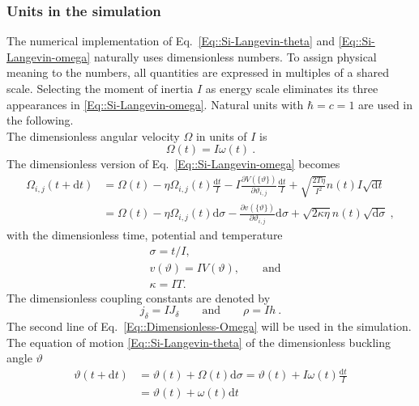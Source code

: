 	\subsubsection{Units in the simulation}
	The numerical implementation of Eq.~\eqref{Eq::Si-Langevin-theta} and \eqref{Eq::Si-Langevin-omega} naturally uses dimensionless numbers. To assign physical meaning to the numbers, all quantities are expressed in multiples of a shared scale. Selecting the moment of inertia $I$ as energy scale eliminates its three appearances in \eqref{Eq::Si-Langevin-omega}. Natural units with $\hbar =	c =	1$ are used in the following. \\
	
	The dimensionless angular velocity $\Omega$ in units of $I$ is
	\begin{equation}
		\Omega(t) =	I\omega(t)~.
	\end{equation}
	The dimensionless version of Eq.~\eqref{Eq::Si-Langevin-omega} becomes
	\begin{equation} \label{Eq::Dimensionless-Omega}
		\begin{split}
			\Omega_{i,j}(t + \text{d}t) &=	\Omega(t) - \eta \Omega_{i,j}(t) \frac{\text{d}t}{I} - {I}\frac{\partial V(\{\vartheta\})}{\partial \vartheta_{i,j}} \frac{\text{d}t}{I} + \sqrt{\frac{2 T \eta}{I^2}} n(t) I \sqrt{\text{d}t} \\
			&=	\Omega(t) - \eta \Omega_{i,j}(t) \text{d}\sigma - \frac{\partial v(\{\vartheta\})}{\partial \vartheta_{i,j}} \text{d}\sigma + \sqrt{{2 \kappa \eta}} n(t) \sqrt{\text{d}\sigma}~,
		\end{split}
	\end{equation}
	with the dimensionless time, potential and temperature
	\begin{align}
		&\sigma =	t /	I, \\
		&v(\vartheta) =	I V(\vartheta), \qquad \text{and} \\
		&\kappa =	IT.
	\end{align}
	The dimensionless coupling constants are denoted by
	\begin{equation} \label{Eq::dimensionless-coupling}
		j_\delta =	IJ_\delta \qquad \text{and} \qquad \rho = I h~.
	\end{equation}
	The second line of Eq.~\eqref{Eq::Dimensionless-Omega} will be used in the simulation. The equation of motion \eqref{Eq::Si-Langevin-theta} of the dimensionless buckling angle $\vartheta$ 
	\begin{equation}
		\begin{split}
			\vartheta(t + \text{d}t) &=	\vartheta(t) + \Omega(t) \text{d}\sigma =	\vartheta(t) + I \omega(t) \frac{\text{d}t}{I} \\
			&= \vartheta(t) + \omega(t) \text{d}t
		\end{split}
	\end{equation}
